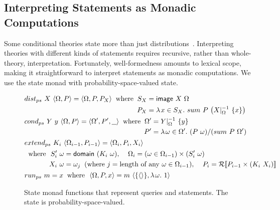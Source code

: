 \subsection{Interpreting Statements as Monadic Computations}

Some conditional theories state more than just distributions~\cite{cit:mateescu-2008amai,cit:toronto-2009cvpr}. Interpreting theories with different kinds of statements requires recursive, rather than whole-theory, interpretation. Fortunately, well-formedness amounts to lexical scope, making it straightforward to interpret statements as monadic computations. We use the state monad with probability-space-valued state.

\begin{figure}[tb]
\centering
\begin{equation*}
\begin{split}
	&\begin{aligned}
		{dist_{ps}}\ {X}\ {\langle{\Omega,P}\rangle} = \langle{\Omega,P,P_X}\rangle
		\;\;\text{where}\;\;
		S_X &= {\mathsf{image}}\ {X}\ {\Omega} \\
		P_X &= \lambda\mspace{2mu}{x \in {S_X}}\ldotp\, {{sum}\ {P}\ {\left({{X}\lvert_{\Omega}^{-1}}\ {\{{x}\}}\right)}}
	\end{aligned} \\
	&\begin{aligned}
		{cond_{ps}}\ {Y}\ {y}\ {\langle{\Omega,P}\rangle} = \langle{\Omega',P',\underbar{ }\underbar{ }}\rangle
		\;\;\text{where}\;\;
		\Omega' &= {{Y}\lvert_{\Omega}^{-1}}\ {\{{y}\}} \\
		P' &= \lambda\mspace{2mu}{\omega \in {\Omega'}}\ldotp\, {{\left({P}\ {\omega}\right)} / {\left({sum}\ {P}\ {\Omega'}\right)}}
	\end{aligned} \\
	&{extend_{ps}}\ {K_i}\ {\langle{\Omega_{i-1},P_{i-1}}\rangle}
		= \langle{\Omega_i,P_i,X_i}\rangle \\
	&\begin{aligned} \;\;\text{where}\ \ 
		{S_i'}\ {\omega} &= {\mathsf{domain}}\ {\left({K_i}\ {\omega}\right)}, \;\;\;\;
		\Omega_i = (\omega \in \Omega_{i-1}) \times {\left({S_i'}\ {\omega}\right)} \\
		{X_i}\ {\omega} &= \omega_j\;\; (\text{where } j = \text{length of any } \omega \in \Omega_{i-1}),\;\;\;\;
		P_i = \mathcal{R}\!\left\llbracket{P_{i-1} \times {\left({K_i}\ {X_i}\right)}}\right\rrbracket
	 \end{aligned} \\
	&{run_{ps}}\ {m} = x \begin{aligned} \;\;\text{where}\ \ \langle{\Omega,P,x}\rangle = {m}\ {\langle{\{{\langle{}\rangle}\},\lambda\mspace{2mu}{\omega}\ldotp\, 1}\rangle} \end{aligned}
\end{split}
\end{equation*}
\hrulefill
\caption[State monad functions for queries and statements]{State monad functions that represent queries and statements. The state is probability-space-valued.}
\label{fig:monad}
\end{figure}

